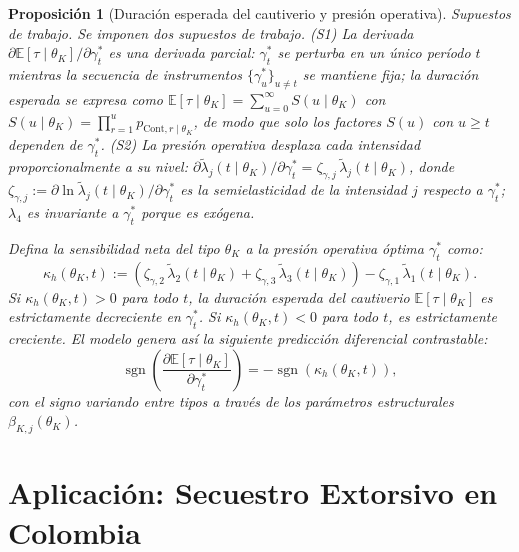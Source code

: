 \documentclass[review,authoryear,12pt]{elsarticle}
\theoremstyle{plain}
\newtheorem{proposition}[theorem]{Proposición}
\theoremstyle{definition}
\newcommand{\1}{\mathbf{1}}
\begin{document}
\begin{proposition}[Duración esperada del cautiverio y presión operativa]
\label{prop:expected-captivity-gamma}
\noindent\textit{Supuestos de trabajo.} Se imponen dos supuestos de trabajo. \textup{(S1)} La derivada $\partial\mathbb{E}[\tau\mid\theta_K]/\partial\gamma_t^\ast$ es una derivada parcial: $\gamma_t^\ast$ se perturba en un único período $t$ mientras la secuencia de instrumentos $\{\gamma_u^\ast\}_{u\neq t}$ se mantiene fija; la duración esperada se expresa como $\mathbb{E}[\tau\mid\theta_K]=\sum_{u=0}^{\infty}S(u\mid\theta_K)$ con $S(u\mid\theta_K)=\prod_{r=1}^{u}p_{\mathrm{Cont},r\mid\theta_K}$, de modo que solo los factores $S(u)$ con $u\geq t$ dependen de $\gamma_t^\ast$. \textup{(S2)} La presión operativa desplaza cada intensidad proporcionalmente a su nivel: $\partial\tilde{\lambda}_j(t\mid\theta_K)/\partial\gamma_t^\ast=\zeta_{\gamma,j}\,\tilde{\lambda}_j(t\mid\theta_K)$, donde $\zeta_{\gamma,j}:=\partial\ln\tilde{\lambda}_j(t\mid\theta_K)/\partial\gamma_t^\ast$ es la semielasticidad de la intensidad $j$ respecto a $\gamma_t^\ast$; $\lambda_4$ es invariante a $\gamma_t^\ast$ porque es exógena.

\medskip
Defina la sensibilidad neta del tipo $\theta_K$ a la presión operativa óptima $\gamma_t^\ast$ como:
\begin{equation}
\label{eq:kappa-c}
\kappa_h(\theta_K, t) := \left( \zeta_{\gamma,2}\, \tilde{\lambda}_2(t \mid \theta_K) + \zeta_{\gamma,3}\, \tilde{\lambda}_3(t \mid \theta_K) \right) - \zeta_{\gamma,1}\, \tilde{\lambda}_1(t \mid \theta_K).
\end{equation}
Si $\kappa_h(\theta_K, t) > 0$ para todo $t$, la duración esperada del cautiverio $\mathbb{E}[\tau \mid \theta_K]$ es estrictamente decreciente en $\gamma_t^\ast$. Si $\kappa_h(\theta_K, t) < 0$ para todo $t$, es estrictamente creciente. El modelo genera así la siguiente predicción diferencial contrastable:
\begin{equation}
\operatorname{sgn} \left( \frac{\partial \mathbb{E}[\tau \mid \theta_K]}{\partial \gamma_t^\ast} \right) = - \operatorname{sgn}(\kappa_h(\theta_K, t)),
\end{equation}
con el signo variando entre tipos a través de los parámetros estructurales $\beta_{K,j}(\theta_K)$.
\end{proposition}
\section{Aplicación: Secuestro Extorsivo en Colombia}\label{sec:application}
\end{document}
